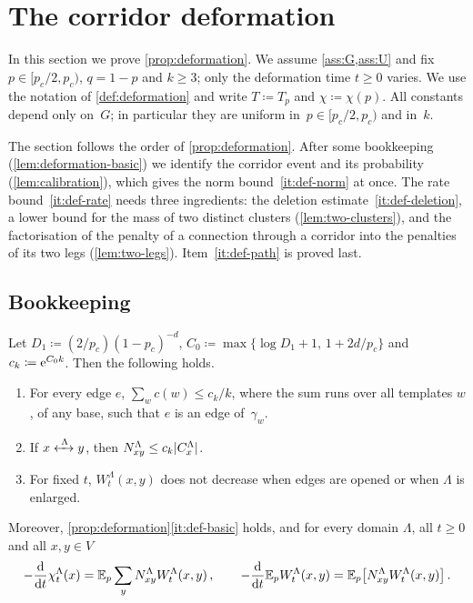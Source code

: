 \section{The corridor deformation}\label{sec:deformation}

In this section we prove \cref{prop:deformation}. We assume \cref{ass:G,ass:U} and fix
$p\in[p_c/2,p_c)$, $q=1-p$ and $k\ge3$; only the deformation time $t\ge0$ varies. We use the notation of
\cref{def:deformation} and write $T\coloneqq T_p$ and $\chi\coloneqq\chi(p)$. All constants depend only
on~$G$; in particular they are uniform in~$p\in[p_c/2,p_c)$ and in~$k$.

The section follows the order of \cref{prop:deformation}. After some bookkeeping
(\cref{lem:deformation-basic}) we identify the corridor event and its probability
(\cref{lem:calibration}), which gives the norm bound~\ref{it:def-norm} at once. The rate
bound~\ref{it:def-rate} needs three ingredients: the deletion estimate~\ref{it:def-deletion}, a lower
bound for the mass of two distinct clusters (\cref{lem:two-clusters}), and the factorisation of the
penalty of a connection through a corridor into the penalties of its two legs (\cref{lem:two-legs}).
Item~\ref{it:def-path} is proved last.

\subsection{Bookkeeping}\label{sec:deformation-basic}

\begin{lemma}\label{lem:deformation-basic}
Let $D_1\coloneqq(2/p_c)(1-p_c)^{-d}$, $C_0\coloneqq\max\{\log D_1+1,\,1+2d/p_c\}$ and
$c_k\coloneqq\mathrm{e}^{C_0k}$. Then the following holds.
\begin{enumerate}[label=\textup{(\roman*)}]
  \item\label{it:weight-edge} For every edge $e$, $\sum_wc(w)\le c_k/k$, where the sum runs over all
  templates $w$, of any base, such that $e$ is an edge of~$\gamma_w$.
  \item\label{it:penalty-size} If $x\xleftrightarrow{\;\Lambda\;}y$, then $N^\Lambda_{xy}\le c_k\lvert C^\Lambda_x\rvert$.
  \item\label{it:monotone-W} For fixed $t$, $W^\Lambda_t(x,y)$ does not decrease when edges are opened
  or when $\Lambda$ is enlarged.
\end{enumerate}
Moreover, \cref{prop:deformation}\ref{it:def-basic} holds, and for every domain $\Lambda$, all
$t\ge0$ and all $x,y\in V$
\begin{equation*}
  -\frac{\d}{\d t}\chi^\Lambda_t(x)=\EE_p\sum_yN^\Lambda_{xy}W^\Lambda_t(x,y)\,,\qquad
  -\frac{\d}{\d t}\EE_pW^\Lambda_t(x,y)=\EE_p\bigl[N^\Lambda_{xy}W^\Lambda_t(x,y)\bigr]\,.
\end{equation*}
\end{lemma}

